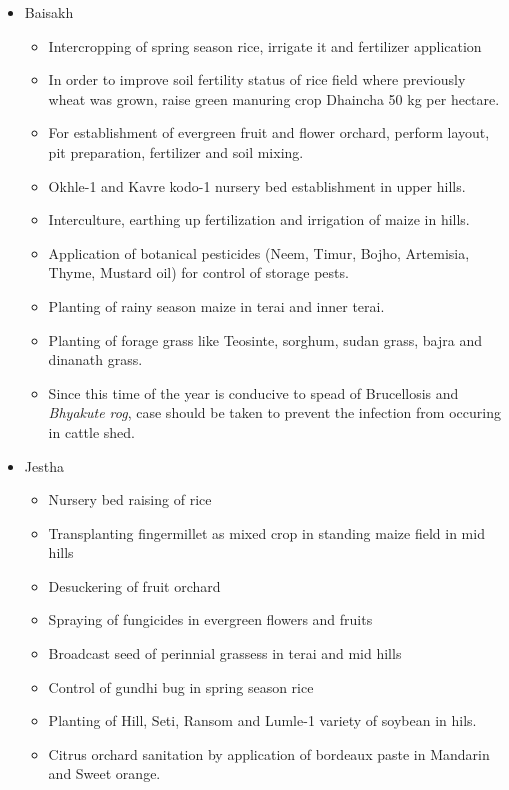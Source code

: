 \documentclass[
]{book}
\providecommand{\tightlist}{%
  \setlength{\itemsep}{0pt}\setlength{\parskip}{0pt}}
\begin{document}
\begin{itemize}
\item
  Baisakh

  \begin{itemize}
  \tightlist
  \item
    Intercropping of spring season rice, irrigate it and fertilizer application
  \item
    In order to improve soil fertility status of rice field where previously wheat was grown, raise green manuring crop Dhaincha 50 kg per hectare.
  \item
    For establishment of evergreen fruit and flower orchard, perform layout, pit preparation, fertilizer and soil mixing.
  \item
    Okhle-1 and Kavre kodo-1 nursery bed establishment in upper hills.
  \item
    Interculture, earthing up fertilization and irrigation of maize in hills.
  \item
    Application of botanical pesticides (Neem, Timur, Bojho, Artemisia, Thyme, Mustard oil) for control of storage pests.
  \item
    Planting of rainy season maize in terai and inner terai.
  \item
    Planting of forage grass like Teosinte, sorghum, sudan grass, bajra and dinanath grass.
  \item
    Since this time of the year is conducive to spead of Brucellosis and \emph{Bhyakute rog}, case should be taken to prevent the infection from occuring in cattle shed.
  \end{itemize}
\item
  Jestha

  \begin{itemize}
  \tightlist
  \item
    Nursery bed raising of rice
  \item
    Transplanting fingermillet as mixed crop in standing maize field in mid hills
  \item
    Desuckering of fruit orchard
  \item
    Spraying of fungicides in evergreen flowers and fruits
  \item
    Broadcast seed of perinnial grassess in terai and mid hills
  \item
    Control of gundhi bug in spring season rice
  \item
    Planting of Hill, Seti, Ransom and Lumle-1 variety of soybean in hils.
  \item
    Citrus orchard sanitation by application of bordeaux paste in Mandarin and Sweet orange.
  \end{itemize}
\end{itemize}
\end{document}
